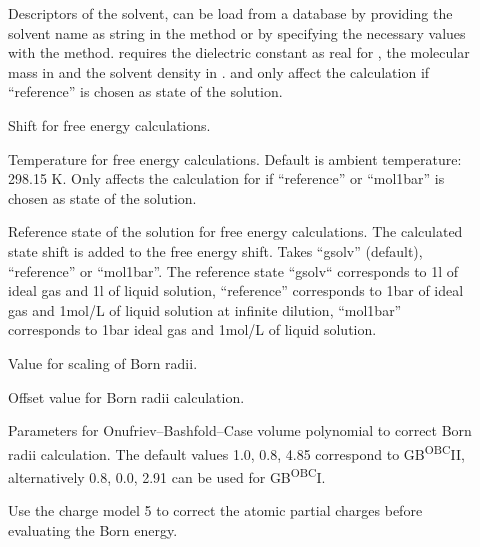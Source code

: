 \begin{description}
  \item[] Descriptors of the solvent, can be load from a database
    by providing the solvent name as string in the  method or
    by specifying the necessary values with the  method.
     requires the dielectric constant as real for ,
    the molecular mass in   and the
    solvent density in  .
     and  only affect the calculation if
    ``reference'' is chosen as state of the solution.

  \item[]  Shift for free energy
    calculations.

  \item[] Temperature for free energy calculations. Default is
    ambient temperature: 298.15 K.
    Only affects the calculation for if ``reference'' or ``mol1bar'' is chosen
    as state of the solution.

  \item[] 
    Reference state of the solution for free energy calculations.
    The calculated state shift is added to the free energy shift.
    Takes ``gsolv'' (default), ``reference'' or ``mol1bar''.
    The reference state ``gsolv`` corresponds to 1\;l of ideal gas and 1\;l of
    liquid  solution,
    ``reference'' corresponds to 1\;bar of ideal gas and 1\;mol/L of liquid
    solution at infinite dilution,
    ``mol1bar'' corresponds to 1\;bar ideal gas and 1\;mol/L of liquid solution.

  \item[] Value for scaling of Born radii.

  \item[] 
    Offset value for Born radii calculation.

  \item[] Parameters for Onufriev--Bashfold--Case volume
    polynomial to correct Born radii calculation.
    The default values 1.0, 0.8, 4.85 correspond to GB\textsuperscript{OBC}II,
    alternatively 0.8, 0.0, 2.91 can be used for GB\textsuperscript{OBC}I.\cite{onufriev2004}

  \item[] Use the charge model 5 to correct the atomic partial charges
    before evaluating the Born energy.


\end{description}
